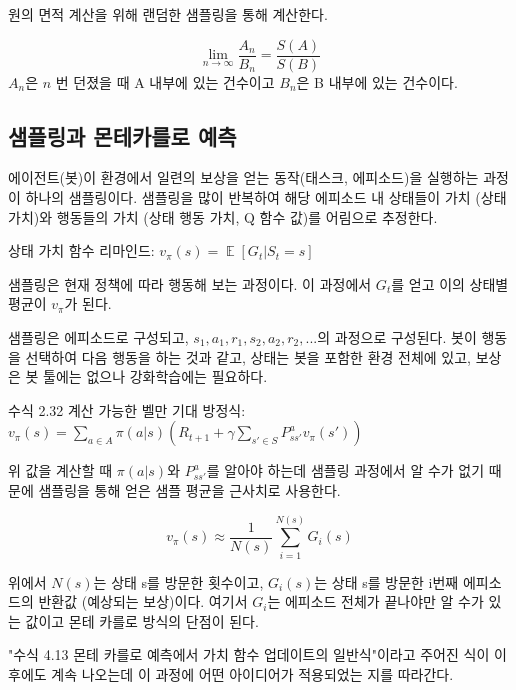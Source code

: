 \documentclass[ %
    a4paper,    %
    amsmath,    %
    itemph,     %
]{oblivoir}     %
\DeclareMathOperator{\E}{\mathbb{E}}
\begin{document}
원의 면적 계산을 위해 랜덤한 샘플링을 통해 계산한다. 

$$
\lim_{n \to \infty} \frac{A_n}{B_n} = \frac{S(A)}{S(B)}
$$
$A_n$은 $n$ 번 던졌을 때 A 내부에 있는 건수이고 $B_n$은 B 내부에 있는 건수이다. 

\subsection{샘플링과 몬테카를로 예측}

에이전트(봇)이 환경에서 일련의 보상을 얻는 동작(태스크, 에피소드)을 실행하는 과정이 
하나의 샘플링이다. 샘플링을 많이 반복하여 해당 에피소드 내 상태들이 가치 (상태 가치)와 
행동들의 가치 (상태 행동 가치, Q 함수 값)를 어림으로 추정한다. 

상태 가치 함수 리마인드: $v_\pi(s) = \E[G_t | S_t = s]$

샘플링은 현재 정책에 따라 행동해 보는 과정이다. 이 과정에서 $G_t$를 얻고 
이의 상태별 평균이 $v_\pi$가 된다. 

샘플링은 에피소드로 구성되고, $s_1, a_1, r_1, s_2, a_2, r_2, ... $의 과정으로 
구성된다. 봇이 행동을 선택하여 다음 행동을 하는 것과 같고, 상태는 봇을 포함한 
환경 전체에 있고, 보상은 봇 툴에는 없으나 강화학습에는 필요하다. 

수식 2.32 계산 가능한 벨만 기대 방정식: 
$
v_\pi(s) = \sum_{a\in A} \pi(a|s) (R_{t+1} + \gamma \sum_{s' \in S} P_{ss'}^a v_\pi(s'))
$

위 값을 계산할 때 $\pi(a|s)$와 $P_{ss'}^a$를 알아야 하는데 샘플링 과정에서
알 수가 없기 때문에 샘플링을 통해 얻은 샘플 평균을 근사치로 사용한다. 

$$
v_\pi(s) \approx \frac{1}{N(s)}\sum_{i=1}^{N(s)} G_i(s)
$$

위에서 $N(s)$는 상태 s를 방문한 횟수이고, $G_i(s)$는 상태 s를 방문한 i번째 에피소드의 
반환값 (예상되는 보상)이다. 여기서 $G_i$는 에피소드 전체가 끝나야만 알 수가 있는 값이고 
몬테 카를로 방식의 단점이 된다.  

"수식 4.13 몬테 카를로 예측에서 가치 함수 업데이트의 일반식"이라고 주어진 식이 
이후에도 계속 나오는데 이 과정에 어떤 아이디어가 적용되었는 지를 따라간다. 
\end{document}
